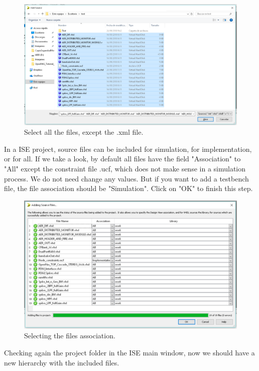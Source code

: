 \begin{figure}[H]
\centering
\includegraphics[width=1\textwidth]{images/Img36_SelectFiles_bis.PNG}
\caption{\label{fig:ISE_select_all}Select all the files, except the .xml file.}
\end{figure}

In a ISE project, source files can be included for simulation, for implementation, or for all. If we take a look, by default all files have the field "Association" to "All" except the constraint file .ucf, which does not make sense in a simulation process. We do not need change any values. But if you want to add a testbench file, the file association should be "Simulation". Click on "OK" to finish this step.

\begin{figure}[H]
\centering
\includegraphics[width=1\textwidth]{images/Img37_AddFilesDone_bis.PNG}
\caption{\label{fig:ISE_accept_add}Selecting the files association.}
\end{figure}

Checking again the project folder in the ISE main window, now we should have a new hierarchy with the included files.


